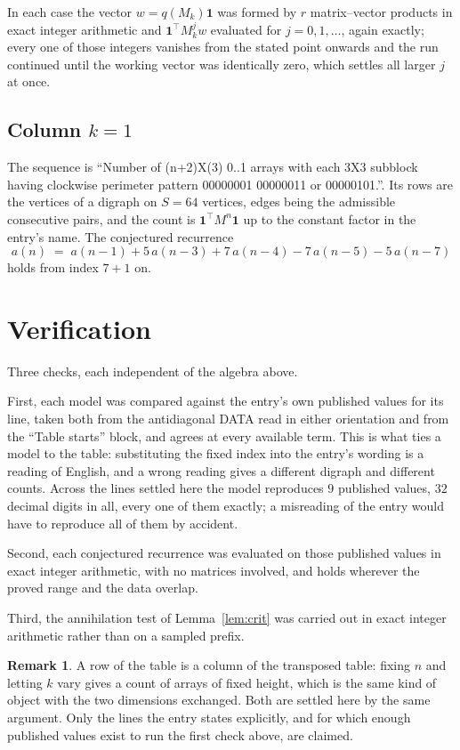 \documentclass[11pt,a4paper]{article}
\theoremstyle{plain}
\theoremstyle{definition}
\newtheorem{remark}[theorem]{Remark}
\begin{document}
In each case the vector $w=q(M_k)\mathbf{1}$ was formed by $r$ matrix--vector products in
exact integer arithmetic and $\mathbf{1}^{\!\top}M_k^{j}w$ evaluated for $j=0,1,\dots$,
again exactly; every one of those integers vanishes from the stated point onwards and the run
continued until the working vector was identically zero, which settles all larger $j$ at once.

\subsection*{Column $k$$=1$}
The sequence is ``Number of (n+2)X(3) 0..1 arrays with each 3X3 subblock having clockwise perimeter pattern 00000001 00000011 or 00000101.''. Its rows are the vertices of a digraph on
$S=64$ vertices, edges being the admissible consecutive pairs, and the count is
$\mathbf{1}^{\!\top}M^{n}\mathbf{1}$ up to the constant factor in the entry's name.
The conjectured recurrence
\[
a(n)\;=\;a(n-1) + 5\,a(n-3) + 7\,a(n-4) - 7\,a(n-5) - 5\,a(n-7)
\]
holds from index $7+1$ on.

\section{Verification}

Three checks, each independent of the algebra above.

First, each model was compared against the entry's own published values for its line, taken
both from the antidiagonal DATA read in either orientation and from the ``Table starts''
block, and agrees at every available term. This is what ties a model to the table:
substituting the fixed index into the entry's wording is a reading of English, and a wrong
reading gives a different digraph and different counts. Across the lines settled here the
model reproduces $9$ published values, $32$ decimal digits in all, every one of
them exactly; a misreading of the entry would have to reproduce all of them by accident.

Second, each conjectured recurrence was evaluated on those published values in exact
integer arithmetic, with no matrices involved, and holds wherever the proved range and the
data overlap.

Third, the annihilation test of Lemma~\ref{lem:crit} was carried out in exact integer
arithmetic rather than on a sampled prefix.

\begin{remark}
A row of the table is a column of the transposed table: fixing $n$ and letting $k$ vary gives a
count of arrays of fixed height, which is the same kind of object with the two dimensions
exchanged. Both are settled here by the same argument. Only the lines the entry states
explicitly, and for which enough published values exist to run the first check above, are
claimed.
\end{remark}
\end{document}
